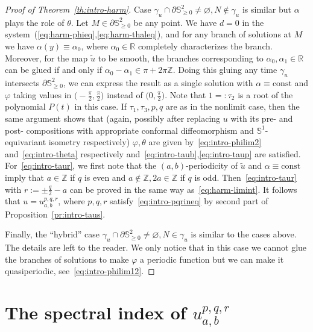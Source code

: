 \documentclass{amsart}
\let\ge\geqslant
\let\emptyset\varnothing
\let\phi\varphi
\newcommand{\const}{\mathrm{const}}
\theoremstyle{plain}
\theoremstyle{definition}
\theoremstyle{remark}
\begin{document}
\begin{proof}[Proof of Theorem~\ref{th:intro-harm}]
Case \(\gamma_u\cap\partial\mathbb S_{\ge 0}^2\ne\emptyset,N\notin\gamma_u\) is
similar but \(\alpha\) plays the role of \(\theta\). Let \(M\in\partial\mathbb
S_{\ge 0}^2\) be any point. We have \(d=0\) in the
system~(\ref{eq:harm-phieq},\ref{eq:harm-thaleq}), and for any branch of
solutions at \(M\) we have \(\alpha(y)\equiv\alpha_0\), where
\(\alpha_0\in\mathbb R\) completely characterizes the branch. Moreover, for the
map \(\tilde u\) to be smooth, the branches corresponding to
\(\alpha_0,\alpha_1\in\mathbb R\) can be glued if and only if
\(\alpha_0-\alpha_1\in\pi+2\pi\mathbb Z\). Doing this gluing any time
\(\gamma_u\) intersects \(\partial\mathbb S_{\ge 0}^2\), we can express the
result as a single solution with \(\alpha\equiv\const\) and \(\phi\) taking
values in \(\bigl(-\frac{\pi}2,\frac{\pi}2\bigr)\) instead of
\(\bigl(0,\frac{\pi}2\bigr)\). Note that \(1=:\tau_2\) is a root of the
polynomial \(P(t)\) in this case. If \(\tau_1,\tau_3,p,q\) are as in the
nonlimit case, then the same argument shows that (again, possibly after
replacing \(u\) with its pre- and post- compositions with appropriate conformal
diffeomorphism and \(\mathbb S^1\)-equivariant isometry respectively)
\(\phi,\theta\) are given by~\eqref{eq:intro-philim2} and~\eqref{eq:intro-theta}
respectively and~\eqref{eq:intro-taub},\eqref{eq:intro-taup} are satisfied.
For~\eqref{eq:intro-taur}, we first note that the \((a,b)\)-periodicity of
\(\tilde u\) and \(\alpha\equiv\const\) imply that \(a\in\mathbb Z\) if \(q\) is
even and \(a\notin\mathbb Z,2a\in\mathbb Z\) if \(q\) is odd.
Then~\eqref{eq:intro-taur} with \(r:=\pm\frac{q}2-a\) can be proved in the same
way as~\eqref{eq:harm-limint}. It follows that \(u=u_{a,b}^{p,q,r}\), where
\(p,q,r\) satisfy~\eqref{eq:intro-pqrineq} by second part of
Proposition~\ref{pr:intro-taus}.

Finally, the ``hybrid'' case \(\gamma_u\cap\partial\mathbb S_{\ge
0}^2\ne\emptyset,N\in\gamma_u\) is similar to the cases above. The details are
left to the reader. We only notice that in this case we cannot glue the branches
of solutions to make \(\phi\) a periodic function but we can make it
quasiperiodic, see~\eqref{eq:intro-philim12}.
\end{proof}

\section{The spectral index of
\texorpdfstring{\(u_{a,b}^{p,q,r}\)}{u\_\{a,b\}\^{}\{p,q,r\}}}\label{sec:weyl}
\end{document}
